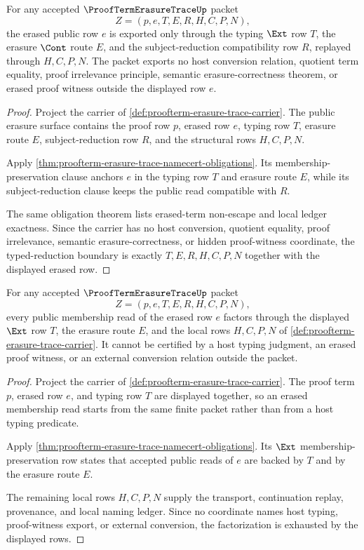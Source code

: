 \begin{theorem}
\label{thm:proofterm-erasure-trace-typed-reduction-boundary}
For any accepted $\ProofTermErasureTraceUp$ packet
$$
Z=(p,e,T,E,R,H,C,P,N),
$$
the erased public row $e$ is exported only through the typing $\Ext$ row $T$, the erasure $\Cont$ route $E$, and the subject-reduction compatibility row $R$, replayed through $H,C,P,N$. The packet exports no host conversion relation, quotient term equality, proof irrelevance principle, semantic erasure-correctness theorem, or erased proof witness outside the displayed row $e$.
\end{theorem}
\begin{proof}
Project the carrier of \autoref{def:proofterm-erasure-trace-carrier}. The public erasure surface contains the proof row $p$, erased row $e$, typing row $T$, erasure route $E$, subject-reduction row $R$, and the structural rows $H,C,P,N$.

Apply \autoref{thm:proofterm-erasure-trace-namecert-obligations}. Its membership-preservation clause anchors $e$ in the typing row $T$ and erasure route $E$, while its subject-reduction clause keeps the public read compatible with $R$.

The same obligation theorem lists erased-term non-escape and local ledger exactness. Since the carrier has no host conversion, quotient equality, proof irrelevance, semantic erasure-correctness, or hidden proof-witness coordinate, the typed-reduction boundary is exactly $T,E,R,H,C,P,N$ together with the displayed erased row.
\end{proof}

\begin{theorem}
\label{thm:proofterm-erasure-trace-ext-membership-factorization}
For any accepted $\ProofTermErasureTraceUp$ packet
$$
Z=(p,e,T,E,R,H,C,P,N),
$$
every public membership read of the erased row $e$ factors through the displayed $\Ext$ row $T$, the erasure route $E$, and the local rows $H,C,P,N$ of \autoref{def:proofterm-erasure-trace-carrier}. It cannot be certified by a host typing judgment, an erased proof witness, or an external conversion relation outside the packet.
\end{theorem}
\begin{proof}
Project the carrier of \autoref{def:proofterm-erasure-trace-carrier}. The proof term $p$, erased row $e$, and typing row $T$ are displayed together, so an erased membership read starts from the same finite packet rather than from a host typing predicate.

Apply \autoref{thm:proofterm-erasure-trace-namecert-obligations}. Its $\Ext$ membership-preservation row states that accepted public reads of $e$ are backed by $T$ and by the erasure route $E$.

The remaining local rows $H,C,P,N$ supply the transport, continuation replay, provenance, and local naming ledger. Since no coordinate names host typing, proof-witness export, or external conversion, the factorization is exhausted by the displayed rows.
\end{proof}

